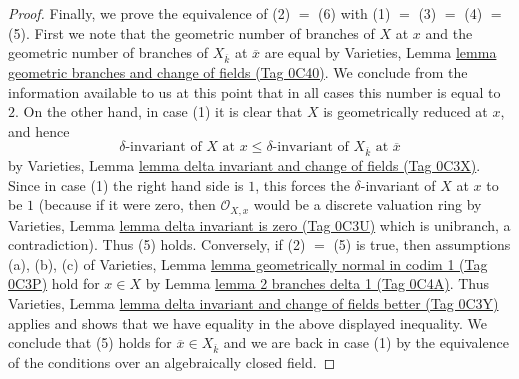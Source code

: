 \documentclass{amsart}
\theoremstyle{plain}
\theoremstyle{definition}
\theoremstyle{remark}
\numberwithin{equation}{subsection}
\begin{document}
\begin{proof}
\medskip\noindent
Finally, we prove the equivalence of (2) $=$ (6) with
(1) $=$ (3) $=$ (4) $=$ (5). First we note that the geometric number
of branches of $X$ at $x$ and the geometric number of branches
of $X_{\overline{k}}$ at $\overline{x}$ are equal by
Varieties, Lemma
\href{https://stacks.math.columbia.edu/tag/0C40}{lemma geometric branches and change of fields (Tag 0C40)}.
We conclude from the information available to us at this point
that in all cases this number is equal to $2$.
On the other hand, in case (1) it is clear that $X$ is geometrically
reduced at $x$, and hence
$$
\delta\text{-invariant of }X\text{ at }x \leq
\delta\text{-invariant of }X_{\overline{k}}\text{ at }\overline{x}
$$
by Varieties, Lemma \href{https://stacks.math.columbia.edu/tag/0C3X}{lemma delta invariant and change of fields (Tag 0C3X)}.
Since in case (1) the right hand side is $1$, this
forces the $\delta$-invariant of $X$ at $x$ to be $1$
(because if it were zero, then $\mathcal{O}_{X, x}$ would
be a discrete valuation ring by
Varieties, Lemma \href{https://stacks.math.columbia.edu/tag/0C3U}{lemma delta invariant is zero (Tag 0C3U)}
which is unibranch, a contradiction). Thus (5) holds.
Conversely, if (2) $=$ (5) is true, then assumptions (a), (b), (c) of
Varieties, Lemma \href{https://stacks.math.columbia.edu/tag/0C3P}{lemma geometrically normal in codim 1 (Tag 0C3P)}
hold for $x \in X$ by
Lemma \href{https://stacks.math.columbia.edu/tag/0C4A}{lemma 2 branches delta 1 (Tag 0C4A)}. Thus
Varieties, Lemma
\href{https://stacks.math.columbia.edu/tag/0C3Y}{lemma delta invariant and change of fields better (Tag 0C3Y)}
applies and shows that we have equality in the above displayed inequality.
We conclude that (5) holds for $\overline{x} \in X_{\overline{k}}$
and we are back in case (1) by the equivalence of the conditions
over an algebraically closed field.
\end{proof}
\end{document}
